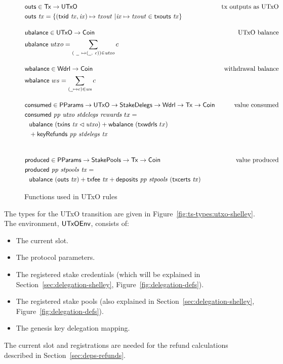 \begin{figure}[htb]
  \begin{align*}
    & \fun{outs} \in \Tx \to \UTxO
    & \text{tx outputs as UTxO} \\
    & \fun{outs} ~ \var{tx} =
        \left\{
          (\fun{txid} ~ \var{tx}, \var{ix}) \mapsto \var{txout} ~
          \middle|
          \var{ix} \mapsto \var{txout} \in \txouts{tx}
        \right\}
    \nextdef
    & \fun{ubalance} \in \UTxO \to \Coin
    & \text{UTxO balance} \\
    & \fun{ubalance} ~ utxo = \sum_{(~\wcard ~ \mapsto (\wcard, ~c)) \in \var{utxo}} c
    \nextdef
    & \fun{wbalance} \in \Wdrl \to \Coin
    & \text{withdrawal balance} \\
    & \fun{wbalance} ~ ws = \sum_{(\wcard\mapsto c)\in\var{ws}} c
    \nextdef
    & \fun{consumed} \in \PParams \to \UTxO \to \StakeDelegs \to \Wdrl \to \Tx \to \Coin
    & \text{value consumed} \\
    & \consumed{pp}{utxo}{stdelegs}{rewards}~{tx} = \\
    & ~~\ubalance{(\txins{tx} \restrictdom \var{utxo})} +
        \fun{wbalance}~(\fun{txwdrls}~{tx}) \\
    & ~~ + \keyRefunds{pp}{stdelegs}{tx} \\
    \nextdef
    & \fun{produced} \in \PParams \to \StakePools \to \Tx \to \Coin
    & \text{value produced} \\
    & \fun{produced}~\var{pp}~\var{stpools}~\var{tx} = \\
    &~~\ubalance{(\outs{tx})}
    + \txfee{tx} + \deposits{pp}{stpools}~{(\txcerts{tx})}\\
  \end{align*}

  \caption{Functions used in UTxO rules}
  \label{fig:functions:utxo}
\end{figure}

\clearpage


The types for the UTxO transition are given in Figure~\ref{fig:ts-types:utxo-shelley}.
The environment, $\mathsf{UTxOEnv}$, consists of:

\begin{itemize}
  \item The current slot.
  \item The protocol parameters.
  \item The registered stake credentials (which will be explained in
    Section~\ref{sec:delegation-shelley}, Figure~\ref{fig:delegation-defs}).
  \item The registered stake pools
    (also explained in Section~\ref{sec:delegation-shelley},
    Figure~\ref{fig:delegation-defs}).
  \item The genesis key delegation mapping.
\end{itemize}
The current slot and registrations are needed for the refund calculations
described in Section~\ref{sec:deps-refunds}.

